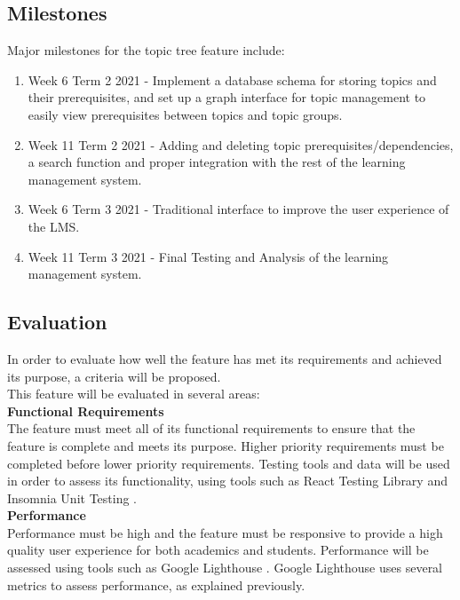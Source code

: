 \newpage
\subsection{Milestones}
Major milestones for the topic tree feature include: \\
\begin{enumerate}
\item Week 6 Term 2 2021 - Implement a database schema for storing topics and their prerequisites, and set up a graph interface for topic management to easily view prerequisites between topics and topic groups.
\item Week 11 Term 2 2021 - Adding and deleting topic prerequisites/dependencies, a search function and proper integration with the rest of the learning management system.
\item Week 6 Term 3 2021 - Traditional interface to improve the user experience of the LMS.
\item Week 11 Term 3 2021 - Final Testing and Analysis of the learning management system.
\end{enumerate}

\subsection{Evaluation}
In order to evaluate how well the feature has met its requirements and achieved its purpose, a criteria will be proposed. \\

This feature will be evaluated in several areas:\\
\textbf{Functional Requirements} \\
The feature must meet all of its functional requirements to ensure that the feature is complete and meets its purpose. Higher priority requirements must be completed before lower priority requirements. Testing tools and data will be used in order to assess its functionality, using tools such as React Testing Library \cite{reactTestingLibrary} and Insomnia Unit Testing \cite{insomniaTesting}.\\

\textbf{Performance} \\
Performance must be high and the feature must be responsive to provide a high quality user experience for both academics and students. Performance will be assessed using tools such as Google Lighthouse \cite{googleLighthouse}. Google Lighthouse uses several metrics to assess performance, as explained previously. \\

